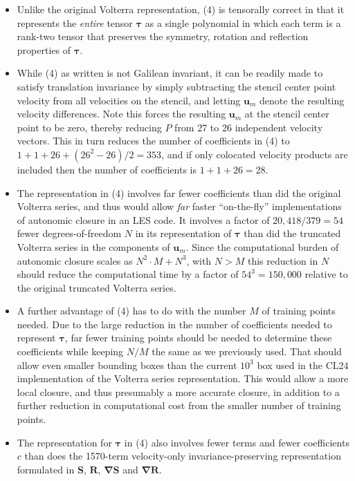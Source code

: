 \begin{itemize}
	\item 	Unlike the original Volterra representation, (4) is tensorally correct in that it represents the \textit{entire} tensor  $\mathbf{\tau}$ as a single polynomial in which each term is a rank-two tensor that preserves the symmetry, rotation and reflection properties of $\mathbf{\tau}$.

	\item	While (4) as written is not Galilean invariant, it can be readily made to satisfy translation invariance by simply subtracting the stencil center point velocity from all velocities on the stencil, and letting  $\mathbf{u}_{m}$ denote the resulting velocity differences.  Note this forces the resulting $\mathbf{u}_{m}$ at the stencil center point to be zero, thereby reducing $P$ from 27 to 26 independent velocity vectors.  This in turn reduces the number of coefficients in (4) to $1 + 1 + 26 + (26^2 - 26)/2 = 353$, and if only colocated velocity products are included then the number of coefficients is $1 + 1 + 26 = 28$.

	\item	The representation in (4) involves far fewer coefficients than did the original Volterra series, and thus would allow \textit{far} faster ``on-the-fly'' implementations of autonomic closure in an LES code. It involves a factor of $20,418/379 = 54$  fewer degrees-of-freedom $N$ in its representation of $\mathbf{\tau}$  than did the truncated Volterra series in the components of $\mathbf{u}_{m}$. Since the computational burden of autonomic closure scales as $N^2 \cdot M + N^3$, with $N > M$  this reduction in $N$ should reduce the computational time by a factor of $54^3 = 150,000$  relative to the original truncated Volterra series.

	\item	A further advantage of (4) has to do with the number $M$ of training points needed. Due to the large reduction in the number of coefficients needed to represent $\mathbf{\tau}$, far fewer training points should be needed to determine these coefficients while keeping $N/M$ the same as we previously used. That should allow even smaller bounding boxes than the current $10^3$ box used in the CL24 implementation of the Volterra series representation. This would allow a more local closure, and thus presumably a more accurate closure, in addition to a further reduction in computational cost from the smaller number of training points.

	\item	The representation for $\mathbf{\tau}$  in (4) also involves fewer terms and fewer coefficients $c$ than does the 1570-term velocity-only invariance-preserving representation formulated in  $\mathbf{S}$, $\mathbf{R}$, $\mathbf{\nabla S}$ and $\mathbf{\nabla R}$.  
\end{itemize}


